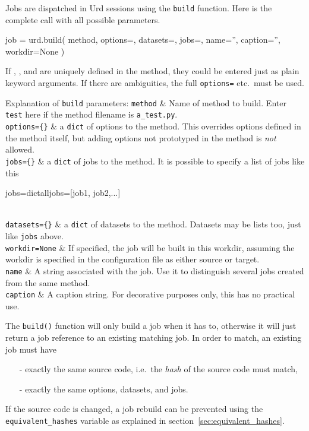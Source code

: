 Jobs are dispatched in Urd sessions using the \texttt{build} function.
Here is the complete call with all possible parameters.
\begin{python}
job = urd.build(
    method,
    options={},    datasets={},    jobs={},
    name='',       caption='',
    workdir=None
)
\end{python}
If \options, \datasets, and \jobs are uniquely defined in the method,
they could be entered just as plain keyword arguments.  If there are
ambiguities, the full \texttt{options=} etc.\ must be used.

Explanation of \texttt{build} parameters:
\starttabletwo
\RPtwo \texttt{method} & Name of method to build.  Enter \texttt{test}
    here if the method filename is \texttt{a\_test.py}.\\
    
\RPtwo \texttt{options=\{\}} & a \texttt{dict} of options to the method.
    This overrides options defined in the method itself, but adding
    options not prototyped in the method is \textsl{not} allowed.\\

\RPtwo \texttt{jobs=\{\}} & a \texttt{dict} of jobs to the method.
    It is possible to specify a list of jobs like this
\begin{python}
jobs=dict{alljobs=[job1, job2,...]}
\end{python}
\\

\RPtwo \texttt{datasets=\{\}} & a \texttt{dict} of datasets to the method.
    Datasets may be lists too, just like \texttt{jobs} above.\\

\RPtwo \texttt{workdir=None} & If specified, the job will be built in
    this workdir, assuming the workdir is specified in the
    configuration file as either source or target.\\

\RPtwo \texttt{name} & A string associated with the job.  Use it
    to distinguish several jobs created from the same method.\\
    
    \texttt{caption} & A caption string.  For decorative purposes
    only, this has no practical use.\\
\stoptabletwo

The \texttt{build()} function will only build a job when it has to,
otherwise it will just return a job reference to an existing matching
job.  In order to match, an existing job must have
\begin{itemize}
\item[-] exactly the same source code, i.e.\ the \textsl{hash} of the source code must match,
\item[-] exactly the same options, datasets, and jobs.
\end{itemize}
If the source code is changed, a job rebuild can be prevented using
the \texttt{equivalent\_hashes} variable as explained in
section~\ref{sec:equivalent_hashes}.



